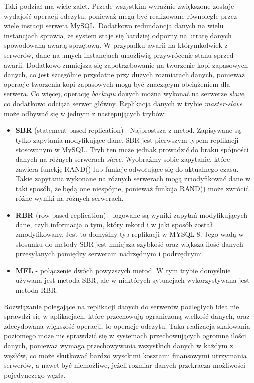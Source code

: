Taki podział ma wiele zalet. Przede wszystkim wyraźnie zwiększone zostaje wydajość operacji odczytu, ponieważ mogą być realizowane równolegle przez wiele instacji serwera MySQL. Dodatkowo redundancja danych na wielu instancjach sprawia, że system staje się bardziej odporny na utratę danych spowodowaną awarią sprzętową. W przypadku awarii na którymkolwiek z serwerów, dane na innych instancjach umożliwią przywrócenie stanu sprzed awarii. Dodatkowo zmniejsza się zapotrzebowanie na tworzenie kopi zapasowych danych, co jest szcególnie przydatne przy dużych rozmiarach danych, ponieważ operacje tworzenia kopi zapasowych mogą być znaczącym obciążeniem dla serwera. Co więcej, operację \textit{backupu} danych można wykonać na serwerze \textit{slave}, co dodatkowo odciąża serwer główny. Replikacja danych w trybie \textit{master-slave} może odbywać się w jednym z następujących trybów:
\begin{itemize}
 	\item \textbf{SBR} (statement-based replication) - Najprostsza z metod. Zapisywane są tylko zapytania modyfikujące dane. SBR jest pierwszym typem replikacji stosowanym w MySQL. Tryb ten może jednak prowadzić do braku spójności danych na różnych serwerach \textit{slave}. Wyobraźmy sobie zapytanie, które zawiera funckję RAND() lub funkcje odwołujące się do aktualnego czasu. Takie zapytania wykonane na różnych serwerach mogą zmodyfikować dane w taki sposób, że będą one niespójne, ponieważ funkcja RAND() może zwrócić różne wyniki na różnych serwerach.
	\item \textbf{RBR} (row-based replication) - logowane są wyniki zapytań modyfikujących dane, czyli informacja o tym, który rekord i w jaki sposób został zmodyfikowany. Jest to domyślny typ replikacji w MYSQL 8. Jego wadą w stosunku do metody SBR jest mniejsza szybkość oraz większa ilość danych przesyłanych pomiędzy serweram nadrzędnym i podrzędnymi.
	\item \textbf{MFL} - połączenie dwóch powyższych metod. W tym trybie domyślnie używana jest metoda SBR, ale w niektórych sytuacjach wykorzystywana jest metoda RBR.
\end{itemize}

Rozwiązanie polegające na replikacji danych do serwerów podległych idealnie sprawdzi się w aplikacjach, które przechowują ograniczoną wielkość danych, oraz zdecydowana większość operacji, to operacje odczytu. Taka realizacja skalowania poziomego może nie sprawdzić się w systemach przechowujących ogromne ilości danych, ponieważ wymaga przechowywania wszystkich danych w każdym z węzłów, co może skutkować bardzo wysokimi kosztami finansowymi utrzymania serwerów, a nawet być niemożliwe, jeżeli rozmiar danych przekracza możliwości pojedynczego węzła. 

